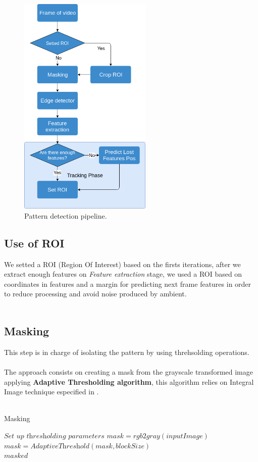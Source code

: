 \documentclass[journal]{IEEEtran}
\begin{document}
\begin{figure}[H]
\centering
\includegraphics[width=2.5in]{_img/algorithm_overview.png}
\caption{Pattern detection pipeline.}
\end{figure}

\subsection{ Use of ROI }
We setted a ROI (Region Of Interest) based on the firsts iterations, after we extract enough features on \textit{Feature extraction} stage, we used a ROI based on coordinates in features and a margin for predicting next frame features in order to reduce processing and avoid noise produced by ambient.
\\
\\
\subsection{ Masking }
This step is in charge of isolating the pattern by using threhsolding operations.
\\
\\
The approach consists on creating a mask from the grayscale transformed image applying \textbf{Adaptive Thresholding algorithm}, this algorithm relies on Integral Image technique especified in \cite{IntegralImageThresholding}.
\\
\\
\begin{algorithm}
\caption{Masking}
\label{alg:mask2}
\begin{algorithmic}[1]
\State $\textit{Set up thresholding parameters}$
\State $mask   = \textit{rgb2gray}( inputImage )$
\State $mask   = \textit{AdaptiveThreshold}(mask, blockSize)$\\
\Return $masked$
\end{algorithmic}
\end{algorithm}
\end{document}
